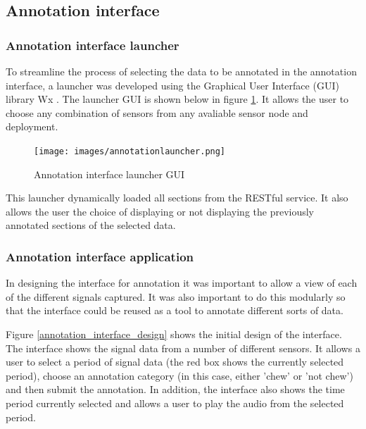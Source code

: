\subsection{Annotation interface}


\subsubsection{Annotation interface launcher}

To streamline the process of selecting the data to be annotated in the annotation interface, a launcher was developed using the Graphical User Interface (GUI) library Wx \cite{rappin2006wxpython}. The launcher GUI is shown below in figure \ref{launcherpic}. It allows the user to choose any combination of sensors from any avaliable sensor node and deployment. 

\begin{figure}[ht!]
\begin{center}
\leavevmode
\texttt{[image: images/annotationlauncher.png]}
\end{center}
\caption{Annotation interface launcher GUI}
\label{launcherpic}
\end{figure}

This launcher dynamically loaded all sections from the RESTful service. It also allows the user the choice of displaying or not displaying the previously annotated sections of the selected data. 

\subsubsection{Annotation interface application}

In designing the interface for annotation it was important to allow a view of each of the different signals captured. It was also important to do this modularly so that the interface could be reused as a tool to annotate different sorts of data.

Figure \ref{annotation_interface_design} shows the initial design of the interface. The interface shows the signal data from a number of different sensors. It allows a user to select a period of signal data (the red box shows the currently selected period), choose an annotation category (in this case, either 'chew' or 'not chew') and then submit the annotation. In addition, the interface also shows the time period currently selected and allows a user to play the audio from the selected period. 

